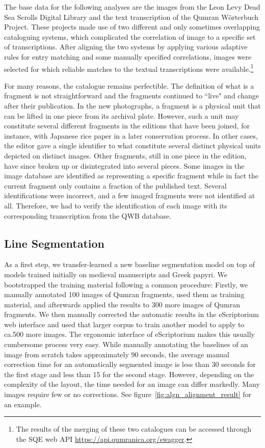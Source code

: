 The base data for the following analyses are the images from the Leon Levy Dead
Sea Scrolls Digital Library and the text transcription of the Qumran Wörterbuch
Project.  These projects made use of two different and only sometimes
overlapping cataloguing systems, which complicated the correlation of image to
a specific set of transcriptions.  After aligning the two systems by applying
various adaptive rules for entry matching and some manually specified
correlations, images were selected for which reliable matches to the textual
transcriptions were available.\footnote{The results of the merging of these two
catalogues can be accessed through the SQE web API
\url{https://api.qumranica.org/swagger}.}

For many reasons, the catalogue remains perfectible.  The definition of what is
a fragment is not straightforward and the fragments continued to ``live" and
change after their publication.  In the new photographs, a fragment is a
physical unit that can be lifted in one piece from its archival plate.
However, such a unit may constitute several different fragments in the editions
that have been joined, for instance, with Japanese rice paper in a later
conservation process.  In other cases, the editor gave a single identifier to
what constitute several distinct physical units depicted on distinct images.
Other fragments, still in one piece in the edition, have since broken up or
disintegrated into several pieces.  Some images in the image database are
identified as representing a specific fragment while in fact the current
fragment only contains a fraction of the published text.  Several
identifications were incorrect, and a few imaged fragments were not identified
at all.  Therefore, we had to verify the identification of each image with its
corresponding transcription from the QWB database.

\subsection{Line Segmentation}\label{sec:lseg}

As a first step, we transfer-learned a new baseline segmentation model on top
of models trained initially on medieval manuscripts and Greek papyri.  We
bootstrapped the training material following a common procedure:  Firstly, we
manually annotated 100 images of Qumran fragments, used them as training
material, and afterwards applied the results to 300 more images of Qumran
fragments.  We then manually corrected the automatic results in the
eScriptorium web interface and used that larger corpus to train another model
to apply to ca.\@ 500 more images.  The ergonomic interface of eScriptorium
makes this usually cumbersome process very easy.  While manually annotating the
baselines of an image from scratch takes approximately 90 seconds, the average
manual correction time for an automatically segmented image is less than 30
seconds for the first stage and less than 15 for the second stage.  However,
depending on the complexity of the layout, the time needed for an image can
differ markedly.  Many images require few or no corrections.  See
figure~\ref{fig:algn_alignment_result} for an example.

